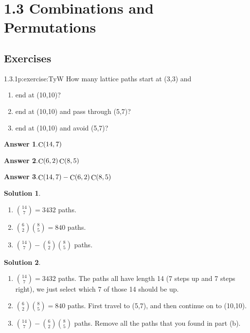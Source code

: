 \documentclass[twoside,11pt,]{book}
\newcommand{\blocktitlefont}{\relax}
\numberwithin{equation}{chapter}
\begin{document}
\section*{1.3 Combinations and Permutations}
\subsection*{Exercises}
\begin{divisionsolution}{1.3.1}{}{p:exercise:TyW}%
How many lattice paths start at (3,3) and%
\begin{enumerate}[label=(\alph*)]
\item{}end at (10,10)?%
\item{}end at (10,10) and pass through (5,7)?%
\item{}end at (10,10) and avoid (5,7)?%
\end{enumerate}
%
\par\smallskip%
\noindent\textbf{\blocktitlefont Answer 1}.\quad{}\(\mathop{\rm C}\nolimits\!\left(14,7\right)\)%
\par\smallskip%
\noindent\textbf{\blocktitlefont Answer 2}.\quad{}\(\mathop{\rm C}\nolimits\!\left(6,2\right)\mathop{\rm C}\nolimits\!\left(8,5\right)\)%
\par\smallskip%
\noindent\textbf{\blocktitlefont Answer 3}.\quad{}\(\mathop{\rm C}\nolimits\!\left(14,7\right)-\mathop{\rm C}\nolimits\!\left(6,2\right)\mathop{\rm C}\nolimits\!\left(8,5\right)\)%
\par\smallskip%
\noindent\textbf{\blocktitlefont Solution 1}.\quad{}%
\begin{enumerate}[label=(\alph*)]
\item{}\({14 \choose 7} = 3432\) paths.%
\item{}\({6 \choose 2}{8\choose 5} = 840\) paths.%
\item{}\({14 \choose 7} - {6\choose 2}{8 \choose 5}\) paths.%
\end{enumerate}
%
\par\smallskip%
\noindent\textbf{\blocktitlefont Solution 2}.\quad{}%
\begin{enumerate}[label=(\alph*)]
\item{}\({14 \choose 7} = 3432\) paths. The paths all have length 14 (7 steps up and 7 steps right), we just select which 7 of those 14 should be up.%
\item{}\({6 \choose 2}{8\choose 5} = 840\) paths. First travel to (5,7), and then continue on to (10,10).%
\item{}\({14 \choose 7} - {6\choose 2}{8 \choose 5}\) paths. Remove all the paths that you found in part (b).%
\end{enumerate}
%
\end{divisionsolution}%
\end{document}
